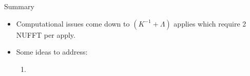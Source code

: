 \documentclass[aspectratio=169,xcolor=dvipsnames]{beamer}
\begin{document}
\begin{frame}{Summary}
    \begin{itemize}
    \item Computational issues come down to $(K^{-1} + \Lambda)$ applies which require 2 NUFFT per apply. 
    \item Some ideas to address:
    \begin{enumerate}
        \item 
    \end{enumerate}
    \end{itemize}
\end{frame}




    

    
    
\end{document}

